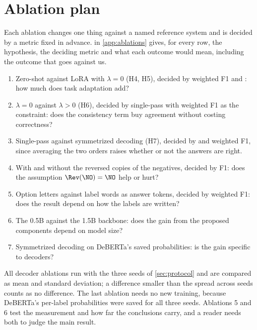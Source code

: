 \section{Ablation plan}
\label{sec:ablations}

Each ablation changes one thing against a named reference system and is decided by a metric fixed in advance.  in \cref{app:ablations} gives, for every row, the hypothesis, the deciding metric and what each outcome would mean, including the outcome that goes against us.

\begin{enumerate}
\setlength{\itemsep}{1pt}
\setlength{\parskip}{0pt}
\item Zero-shot against LoRA with $\lambda = 0$ (H4, H5), decided by weighted F1 and \HardCons{}: how much does task adaptation add?
\item $\lambda = 0$ against $\lambda > 0$ (H6), decided by single-pass \SoftCons{} with weighted F1 as the constraint: does the consistency term buy agreement without costing correctness?
\item Single-pass against symmetrized decoding (H7), decided by \HardCons{} and weighted F1, since averaging the two orders raises \SoftCons{} whether or not the answers are right.
\item With and without the reversed copies of the negatives, decided by \NO{} F1: does the assumption $\Rev(\NO) = \NO$ help or hurt?
\item Option letters against label words as answer tokens, decided by weighted F1: does the result depend on how the labels are written?
\item The 0.5B against the 1.5B backbone: does the gain from the proposed components depend on model size?
\item Symmetrized decoding on DeBERTa's saved probabilities: is the gain specific to decoders?
\end{enumerate}

All decoder ablations run with the three seeds of \cref{sec:protocol} and are compared as mean and standard deviation; a difference smaller than the spread across seeds counts as no difference. The last ablation needs no new training, because DeBERTa's per-label probabilities were saved for all three seeds. Ablations 5 and 6 test the measurement and how far the conclusions carry, and a reader needs both to judge the main result.

